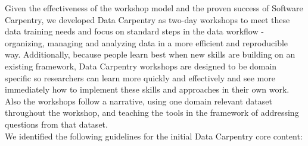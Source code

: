 \documentclass[15]{idcc}
\begin{document}
Given the effectiveness of the workshop model and the proven success of Software Carpentry, we developed
Data Carpentry as two-day workshops to meet these data training needs and focus on standard steps in the data workflow -
organizing, managing and analyzing data
in a more efficient and reproducible way. Additionally, because people learn best when new skills are building on
an existing framework, Data Carpentry workshops are designed to be domain specific so researchers can learn more
quickly and effectively and see more
immediately how to implement these skills and approaches in their own work. Also the workshops follow a narrative, using one
domain relevant dataset throughout the workshop, and teaching the tools in the framework of addressing questions from
that dataset.\\

We identified the following guidelines for the initial Data Carpentry core content:
\end{document}
